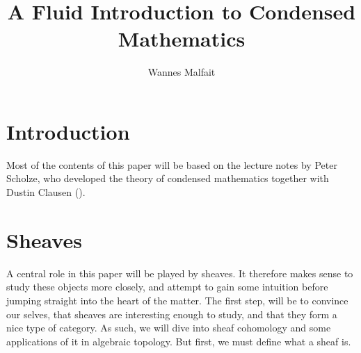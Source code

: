 \documentclass{article}
\title{A Fluid Introduction to Condensed Mathematics}
\author{Wannes Malfait}
\date{}
\begin{document}
\maketitle
\newpage
\tableofcontents

\section{Introduction}
Most of the contents of this paper will be based on the lecture
notes by Peter Scholze, who developed the theory of condensed mathematics
together with Dustin Clausen (\cite{Sch2019LecturesCM}).

\section{Sheaves}
A central role in this paper will be played by sheaves.
It therefore makes sense to study these objects more closely,
and attempt to gain some intuition before jumping straight into
the heart of the matter.
The first step, will be to convince our selves, that sheaves
are interesting enough to study, and that they form a nice type
of category. As such, we will dive into sheaf cohomology and some
applications of it in algebraic topology. But first, we must
define what a sheaf is.
\end{document}
